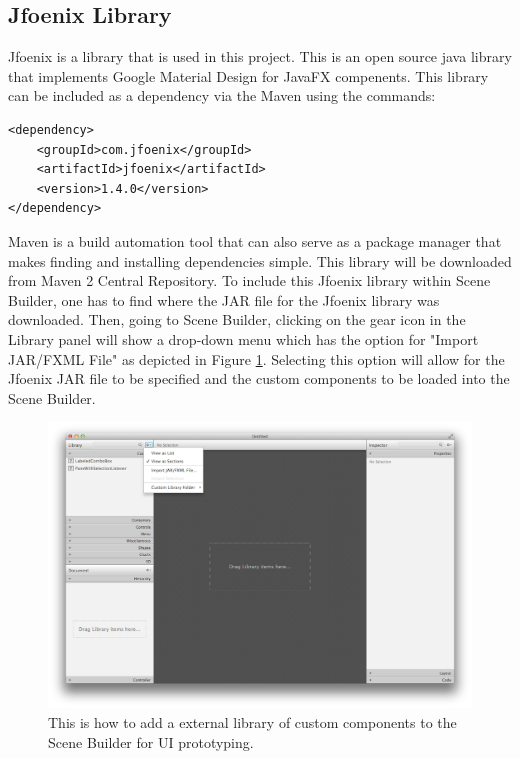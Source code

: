 \subsection{Jfoenix Library}

Jfoenix is a library that is used in this project. This is an open source java library that implements Google Material Design for JavaFX compenents. This library can be included as a dependency via the Maven using the commands: 
\begin{lstlisting}
<dependency>
    <groupId>com.jfoenix</groupId>
    <artifactId>jfoenix</artifactId>
    <version>1.4.0</version>
</dependency>
\end{lstlisting}

Maven is a build automation tool that can also serve as a package manager that makes finding and installing dependencies simple. This library will be downloaded from Maven 2 Central Repository. To include this Jfoenix library within Scene Builder, one has to find where the JAR file for the Jfoenix library was downloaded. Then, going to Scene Builder, clicking on the gear icon in the Library panel will show a drop-down menu which has the option for "Import JAR/FXML File" as depicted in Figure \ref{fig:addLibrarySceneBuilder}. Selecting this option will allow for the Jfoenix JAR file to be specified and the custom components to be loaded into the Scene Builder. 
\begin{figure}[th]
\centering
\includegraphics[scale=0.35]{Figures/addLibrarySceneBuilder.png}
\caption{This is how to add a external library of custom components to the Scene Builder for UI prototyping.}
\label{fig:addLibrarySceneBuilder}
\end{figure}
